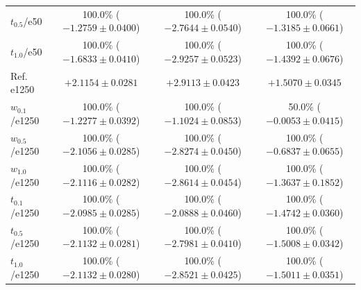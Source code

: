 \begin{table}[t]
\begin{tabular}{p{1.5cm}ccc}
$t_{0.5}$/e50 & \makecell{100.0\% \\ ($-1.2759 \pm 0.0400$)} & \makecell{100.0\% \\ ($-2.7644 \pm 0.0540$)} & \makecell{100.0\% \\ ($-1.3185 \pm 0.0661$)} \\ \hdashline
$t_{1.0}$/e50 & \makecell{100.0\% \\ ($-1.6833 \pm 0.0410$)} & \makecell{100.0\% \\ ($-2.9257 \pm 0.0523$)} & \makecell{100.0\% \\ ($-1.4392 \pm 0.0676$)} \\
\midrule
Ref. e1250 & $+2.1154 \pm 0.0281$ & $+2.9113 \pm 0.0423$ & $+1.5070 \pm 0.0345$ \\ \hline
$w_{0.1}$/e1250 & \makecell{100.0\% \\ ($-1.2277 \pm 0.0392$)} & \makecell{100.0\% \\ ($-1.1024 \pm 0.0853$)} & \makecell{50.0\% \\ ($-0.0053 \pm 0.0415$)} \\ \hdashline
$w_{0.5}$/e1250 & \makecell{100.0\% \\ ($-2.1056 \pm 0.0285$)} & \makecell{100.0\% \\ ($-2.8274 \pm 0.0450$)} & \makecell{100.0\% \\ ($-0.6837 \pm 0.0655$)} \\ \hdashline
$w_{1.0}$/e1250 & \makecell{100.0\% \\ ($-2.1116 \pm 0.0282$)} & \makecell{100.0\% \\ ($-2.8614 \pm 0.0454$)} & \makecell{100.0\% \\ ($-1.3637 \pm 0.1852$)} \\ \hdashline
$t_{0.1}$/e1250 & \makecell{100.0\% \\ ($-2.0985 \pm 0.0285$)} & \makecell{100.0\% \\ ($-2.0888 \pm 0.0460$)} & \makecell{100.0\% \\ ($-1.4742 \pm 0.0360$)} \\ \hdashline
$t_{0.5}$/e1250 & \makecell{100.0\% \\ ($-2.1132 \pm 0.0281$)} & \makecell{100.0\% \\ ($-2.7981 \pm 0.0410$)} & \makecell{100.0\% \\ ($-1.5008 \pm 0.0342$)} \\ \hdashline
$t_{1.0}$/e1250 & \makecell{100.0\% \\ ($-2.1132 \pm 0.0280$)} & \makecell{100.0\% \\ ($-2.8521 \pm 0.0425$)} & \makecell{100.0\% \\ ($-1.5011 \pm 0.0351$)} \\
\bottomrule
\end{tabular}
\end{table}

